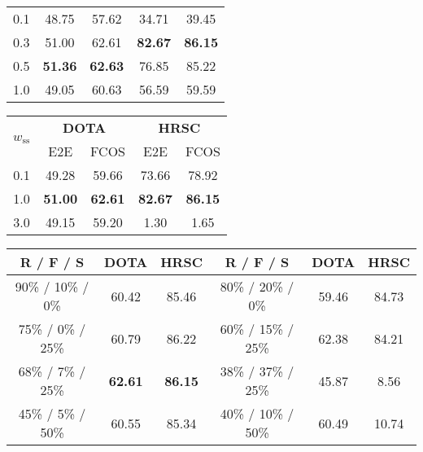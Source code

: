 \begin{table*}[!tb]
\begin{minipage}[t]{0.315\linewidth}
\begin{tabular}{c|cc|cc}
0.1 & 48.75 & 57.62 & 34.71 & 39.45 \\
\rowcolor{gray!20} 0.3 & 51.00 & 62.61 & \textbf{82.67} & \textbf{86.15} \\
0.5 & \textbf{51.36} & \textbf{62.63} & 76.85 & 85.22 \\
1.0 & 49.05 & 60.63 & 56.59 & 59.59 \\
\bottomrule
\end{tabular}
\caption{Ablation with the weight of $\mathcal{L}_\text{E}$.}
\label{tab:abl_le}
\end{minipage}
\vspace{-4pt}
\end{table*}

\begin{table*}[!tb]
\fontsize{8.5pt}{10pt}\selectfont
\setlength{\tabcolsep}{2.04mm}
\setlength{\aboverulesep}{0.4ex}
\setlength{\belowrulesep}{0.4ex}
\setlength{\abovecaptionskip}{1.5mm}
\hspace{1pt}
\begin{minipage}[t]{0.315\linewidth}
\centering
\begin{tabular}{c|cc|cc}
\toprule
\multirow{2}{*}{$w_\text{ss}$} & \multicolumn{2}{c|}{\textbf{DOTA}} & \multicolumn{2}{c}{\textbf{HRSC}} \\
                  & {E2E} & {FCOS} & {E2E} & {FCOS} \\ \midrule
0.1 & 49.28 & 59.66 & 73.66 & 78.92 \\
\rowcolor{gray!20} 1.0 & \textbf{51.00} & \textbf{62.61} & \textbf{82.67} & \textbf{86.15} \\
3.0 & 49.15 & 59.20 & 1.30  & 1.65 \\
\bottomrule
\end{tabular}
\caption{Ablation with the weight of $\mathcal{L}_\text{ss}$.}
\label{tab:abl_lss}
\end{minipage}
\quad
\begin{minipage}[t]{0.647\linewidth}
\setlength{\tabcolsep}{3.05mm}
\centering
\begin{tabular}{c|c|c||c|c|c}
\toprule
{R / F / S} & {\textbf{DOTA}} & {\textbf{HRSC}} & {R / F / S} & {\textbf{DOTA}} & {\textbf{HRSC}} \\
 \midrule
90\% / 10\% / 0\% & 60.42 & 85.46 & 80\% / 20\% / 0\%  & 59.46 & 84.73 \\
75\% / 0\% / 25\% & 60.79 & 86.22 & 60\% / 15\% / 25\% & 62.38 & 84.21 \\
\cellcolor{gray!20}68\% / 7\% / 25\% & \cellcolor{gray!20}\textbf{62.61} & \cellcolor{gray!20}\textbf{86.15} & 38\% / 37\% / 25\% & 45.87 & 8.56  \\
45\% / 5\% / 50\% & 60.55 & 85.34 & 40\% / 10\% / 50\% & 60.49 & 10.74 \\
\bottomrule
\end{tabular}
\caption{Ablation with the proportion of augmented views in self-supervision.}
\label{tab:abl_pro}
\end{minipage}
\vspace{-10pt}
\end{table*}

